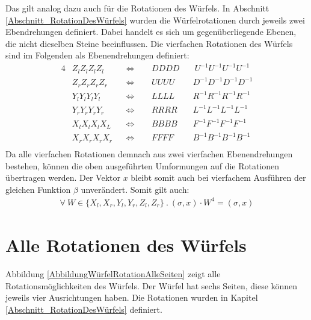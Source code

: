 \documentclass[12pt,a4paper, usenames, dvipsnames]{article}
\theoremstyle{mystyle}
\theoremstyle{definition}
\begin{document}
Das gilt analog dazu auch für die Rotationen des Würfels. In Abschnitt \ref{Abschnitt_RotationDesWürfels} wurden die Würfelrotationen durch jeweils zwei Ebendrehungen definiert. Dabei handelt es sich um gegenüberliegende Ebenen, die nicht dieselben Steine beeinflussen. Die vierfachen Rotationen des Würfels sind im Folgenden als Ebenendrehungen definiert:
\begin{alignat*}{4}
& Z_lZ_lZ_lZ_l && \Leftrightarrow \ \ &&  DDDD  && \ U^{-1} U^{-1} U^{-1} U^{-1} \\
& Z_rZ_rZ_rZ_r && \Leftrightarrow &&   UUUU  && D^{-1}D^{-1}D^{-1}D^{-1}\\
& Y_lY_lY_lY_l && \Leftrightarrow && LLLL &&  R^{-1}R^{-1}R^{-1}R^{-1} \\
& Y_rY_rY_rY_r && \Leftrightarrow &&  RRRR &&  L^{-1} L^{-1} L^{-1} L^{-1} \\
& X_lX_lX_lX_L && \Leftrightarrow && BBBB &&  F^{-1}F^{-1}F^{-1}F^{-1} \\
& X_rX_rX_rX_r && \Leftrightarrow && FFFF  && B^{-1}B^{-1}B^{-1}B^{-1}   \\
\end{alignat*}
Da alle vierfachen Rotationen demnach aus zwei vierfachen Ebenendrehungen bestehen, können die oben ausgeführten Umformungen auf die Rotationen übertragen werden. Der Vektor $x$ bleibt somit auch bei vierfachem Ausführen der gleichen Funktion $\beta$ unverändert. Somit gilt auch:
\begin{align*}
\forall \ W \in \{X_l, X_r, Y_l, Y_r, Z_l, Z_r\} \ . \ (\sigma, x) \cdot W^4 = (\sigma, x)
\end{align*}





%
%
%
%
%
%
%
%
%
%
%
%
%
%
%
%
%
%
%
\newpage

\section{Alle Rotationen des Würfels}
\label{Anhang_RotationenDesWürfels}

Abbildung \ref{AbbildungWürfelRotationAlleSeiten} zeigt alle Rotationsmöglichkeiten des Würfels. Der Würfel hat sechs Seiten, diese können jeweils vier Ausrichtungen haben. Die Rotationen wurden in Kapitel \ref{Abschnitt_RotationDesWürfels} definiert.
\end{document}
